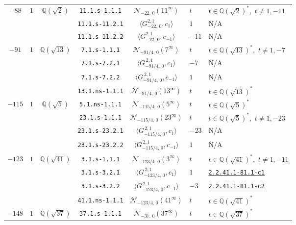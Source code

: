 \documentclass[11pt]{amsart}
\newcommand{\ecnflabel}[2]{\href{https://www.lmfdb.org/EllipticCurve/#1-#2}{\texttt{#1-#2}}}
\theoremstyle{definition}
\newcommand{\Q}{\mathbb Q}
\begin{document}
{\begin{longtable}{|c|c|c|c|c|l|l|}
{$-88$} & {$1$} &  {$\Q(\sqrt{2})$} 
&  \texttt{11.1.s-1.1.1} & $\mathcal{N}_{-22,\,0}(11^{\infty})$ &   $t$ &  $t\in \Q(\sqrt{2})^*,\,\,t\ne 1,-11 $ \\ \cline{4-7} 
& & & \texttt{11.1.s-11.2.1} & $\langle G^{2,1}_{-22,\,0},c_{1}\rangle$ &   $1$ &  N/A \\ \cline{4-7} 
& & &  \texttt{11.1.s-11.2.2} & $\langle G^{2,1}_{-22,\,0},c_{-1}\rangle$ &   $-11$ &  N/A \\ \hline
{$-91$}&  {$1$} &  {$\Q(\sqrt{13})$} 
 & \texttt{7.1.s-1.1.1} & $\mathcal{N}_{-91/4,\,0}(7^{\infty})$ &   $t$ &  $t\in \Q(\sqrt{13})^*,\,\,t\ne 1,-7 $ \\ \cline{4-7} 
&  & & \texttt{7.1.s-7.2.1} & $\langle G^{\,2,1}_{-91/4,\,0},c_{1}\rangle$ &   $-7$ & N/A  \\ \cline{4-7} 
&  & & \texttt{7.1.s-7.2.2} & $\langle G^{\, 2,1}_{-91/4,\,0},c_{-1}\rangle$ &   $1$ &  N/A \\ \cline{4-7} 
&  & & \texttt{13.1.ns-1.1.1} & $\mathcal{N}_{-91/4,\,0}(13^{\infty})$ &   $t$ &  $t\in \Q(\sqrt{13})^*$ \\ \hline
{$-115$}  & {$1$} &  {$\Q(\sqrt{5})$} 
 & \texttt{5.1.ns-1.1.1} & $\mathcal{N}_{-115/4,\,0}(5^{\infty})$ &   $t$ &  $t\in \Q(\sqrt{5})^*$ \\ \cline{4-7} 
&  & & \texttt{23.1.s-1.1.1} & $\mathcal{N}_{-115/4,\,0}(23^{\infty})$ &   $t$ &  $t\in \Q(\sqrt{5})^*,\,\,t\ne 1,-23 $ \\ \cline{4-7} 
& & &  \texttt{23.1.s-23.2.1} & $\langle G^{\,2,1}_{-115/4,\,0},c_{1}\rangle$ &   $-23$ &  N/A \\ \cline{4-7} 
& &  & \texttt{23.1.s-23.2.2} & $\langle G^{\, 2,1}_{-115/4,\,0},c_{-1}\rangle$ &   $1$ &  N/A \\ \hline
{$-123$} & {$1$} &  {$\Q(\sqrt{41})$} 
 & \texttt{3.1.s-1.1.1} & $\mathcal{N}_{-123/4,\,0}(3^{\infty})$ &   $t$ &  $t\in \Q(\sqrt{41})^*,\,\,t\ne 1,-11 $ \\ \cline{4-7} 
& &  & \texttt{3.1.s-3.2.1} & $\langle G^{\,2,1}_{-123/4,\,0},c_{1}\rangle$ &   $1$ & \ecnflabel{2.2.41.1}{81.1-c1}   \\ \cline{4-7} 
& &  & \texttt{3.1.s-3.2.2} & $\langle G^{\, 2,1}_{-123/4,\,0},c_{-1}\rangle$ &   $-3$ & \ecnflabel{2.2.41.1}{81.1-c2}  \\ \cline{4-7} 
& &  & \texttt{41.1.ns-1.1.1} & $\mathcal{N}_{-123/4,\,0}(41^{\infty})$ &   $t$ &  $t\in \Q(\sqrt{41})^*$ \\ \hline
$-148$ & $1$ &  $\Q(\sqrt{37})$ &\texttt{37.1.s-1.1.1} & $\mathcal{N}_{-37,\,0}(37^{\infty})$ &   $t$ &  $t\in \Q(\sqrt{37})^*$ \\ \hline

\end{longtable}}
\end{document}
